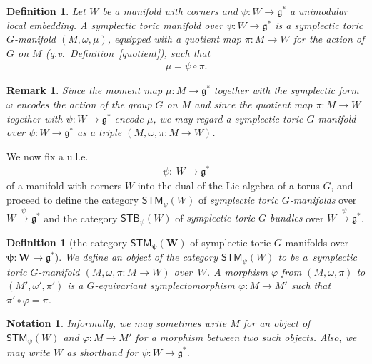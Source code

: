 \documentclass[10pt,a4paper]{amsart}
\numberwithin{equation}{section}
\newtheorem{Definition}[Lemma]{Definition}
\newtheorem{Remark}[Lemma]{Remark}
\newtheorem{Notation}[Lemma]{Notation}
\begin{document}
\begin{Definition}
  Let $W$ be a manifold with corners and $\psi\colon W\to{\mathfrak g}^*$ a unimodular
  local embedding.
  A {\em symplectic toric manifold over $\psi\colon W\to{\mathfrak g}^*$}
  is a symplectic toric $G$-manifold $(M,\omega,\mu)$,
  equipped with a quotient map $\pi\colon M\to W$
  for the action of $G$ on $M$ (q.v.\ Def\/inition~\ref{quotient}),
  such that
\begin{gather*}
\mu = \psi \circ \pi.
\end{gather*}
\end{Definition}

\begin{Remark}
  Since the moment map $\mu\colon M\to {\mathfrak g}^*$ together with the symplectic
  form $\omega$ encodes the action of the group $G$ on $M$ and since
  the quotient map $\pi\colon M\to W$ together with $\psi\colon W\to{\mathfrak g}^*$ encode
  $\mu$, we may regard a symplectic toric $G$-manifold over $\psi\colon W\to
  {\mathfrak g}^*$ as a triple $(M,\omega, \pi\colon M\to W)$.
\end{Remark}

We now f\/ix a u.l.e.\
\begin{gather*}
\psi \colon \  W \to {\mathfrak g}^*
\end{gather*}
of a manifold with corners $W$ into the dual of the Lie algebra
of a torus $G$,
and proceed to def\/ine the category ${\textsf{STM}}_\psi(W)$
of \emph{symplectic toric $G$-manifolds} over $W\stackrel{\psi}{\to} {\mathfrak g}^*$
and the category ${\textsf{STB}}_\psi(W)$
of \emph{symplectic toric $G$-bundles} over $W\stackrel{\psi}{\to} {\mathfrak g}^*$.


\begin{Definition}[the category $\mathbf{{\textsf{STM}}_\psi (W)}$ of symplectic toric
  $G$-manifolds over $\mathbf{\psi\colon W\to {\mathfrak g}^*}$] \label{def:STM}
  We
  def\/ine an \emph{object} of the category ${\textsf{STM}}_\psi(W)$ to be a~symplectic toric $G$-manifold  \mbox{$(M,\omega, \pi\colon M{\to} W)$} over~$W$.
  A \emph{morphism} $\varphi$ from $(M, \omega,  \pi)$
  to $(M', \omega', \pi') $
  is a $G$-equivariant symplectomorphism $\varphi \colon M \to M'$
  such that $\pi' \circ \varphi = \pi$.
\end{Definition}


\begin{Notation} \label{notation for STM}\sloppy
Informally, we may sometimes write  $M$ for an object of
${\textsf{STM}}_\psi (W)$ and \mbox{$\varphi \colon M \to M'$} for a
morphism between two such objects.
Also, we may write $W$ as shorthand for
\mbox{$\psi \colon W \to {\mathfrak g}^*$}.
\end{Notation}
\end{document}

